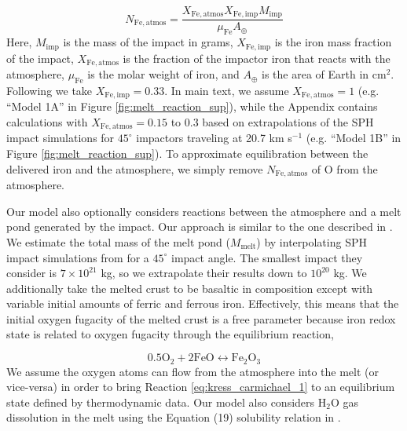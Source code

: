 \begin{equation}
  N_\mathrm{Fe,atmos} = \frac{X_\mathrm{Fe,atmos} X_\mathrm{Fe,imp} M_\mathrm{imp}}{\mu_\mathrm{Fe} A_\oplus}
\end{equation}
Here, $M_\mathrm{imp}$ is the mass of the impact in grams, $X_\mathrm{Fe,imp}$ is the iron mass fraction of the impact, $X_\mathrm{Fe,atmos}$ is the fraction of the impactor iron that reacts with the atmosphere, $\mu_\mathrm{Fe}$ is the molar weight of iron, and $A_\oplus$ is the area of Earth in cm$^2$. Following \citet{Zahnle_2020} we take $X_\mathrm{Fe,imp} = 0.33$. In main text, we assume $X_\mathrm{Fe,atmos} = 1$ (e.g. ``Model 1A'' in Figure \ref{fig:melt_reaction_sup}), while the Appendix contains calculations with $X_\mathrm{Fe,atmos} = 0.15$ to $0.3$ based on extrapolations of the \citet{Citron_2022} SPH impact simulations for $45^{\circ}$ impactors traveling at 20.7 km s$^{-1}$ (e.g. ``Model 1B'' in Figure \ref{fig:melt_reaction_sup}). To approximate equilibration between the delivered iron and the atmosphere, we simply remove $N_\mathrm{Fe,atmos}$ of O from the atmosphere.

Our model also optionally considers reactions between the atmosphere and a melt pond generated by the impact. Our approach is similar to the one described in \citet{Itcovitz_2022}. We estimate the total mass of the melt pond ($M_\mathrm{melt}$) by interpolating SPH impact simulations from \citet{Citron_2022} for a $45^{\circ}$ impact angle. The smallest impact they consider is $7 \times 10^{21}$ kg, so we extrapolate their results down to $10^{20}$ kg. We additionally take the melted crust to be basaltic in composition except with variable initial amounts of ferric and ferrous iron. Effectively, this means that the initial oxygen fugacity of the melted crust is a free parameter because iron redox state is related to oxygen fugacity through the equilibrium reaction,

\begin{equation} 
  \label{eq:kress_carmichael_1}
  0.5 \mathrm{O_2} + 2 \mathrm{FeO} \leftrightarrow \mathrm{Fe_2O_3}
\end{equation}
We assume the oxygen atoms can flow from the atmosphere into the melt (or vice-versa) in order to bring Reaction \ref{eq:kress_carmichael_1} to an equilibrium state defined by \citet{Kress_1991} thermodynamic data. Our model also considers H$_2$O gas dissolution in the melt using the Equation (19) solubility relation in \citet{Itcovitz_2022}.

